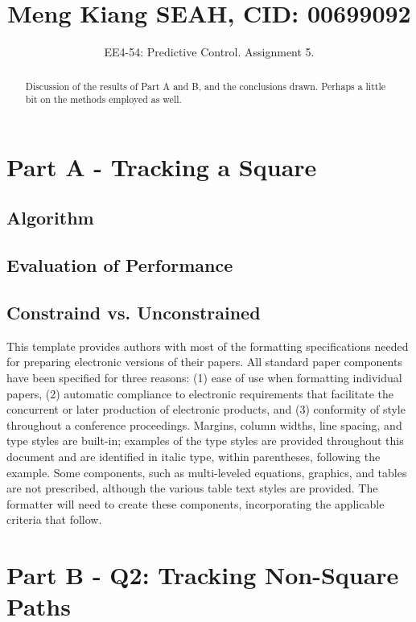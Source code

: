 \documentclass[letterpaper, 10 pt, conference]{ieeeconf} %
\title{\LARGE \bf
Meng Kiang SEAH, CID: 00699092
}
\author{EE4-54: Predictive Control. Assignment 5. %
}
\begin{document}
\maketitle
\thispagestyle{empty}
\pagestyle{empty}


\begin{abstract}
Discussion of the results of Part A and B, and the conclusions drawn. Perhaps a little bit on the methods employed as well.
\end{abstract}


\section{Part A - Tracking a Square}
\subsection{Algorithm}
\subsection{Evaluation of Performance}
\subsection{Constraind vs. Unconstrained}

This template provides authors with most of the formatting specifications needed for preparing electronic versions of their papers. All standard paper components have been specified for three reasons: (1) ease of use when formatting individual papers, (2) automatic compliance to electronic requirements that facilitate the concurrent or later production of electronic products, and (3) conformity of style throughout a conference proceedings. Margins, column widths, line spacing, and type styles are built-in; examples of the type styles are provided throughout this document and are identified in italic type, within parentheses, following the example. Some components, such as multi-leveled equations, graphics, and tables are not prescribed, although the various table text styles are provided. The formatter will need to create these components, incorporating the applicable criteria that follow.

\section{Part B - Q2: Tracking Non-Square Paths}
\end{document}
